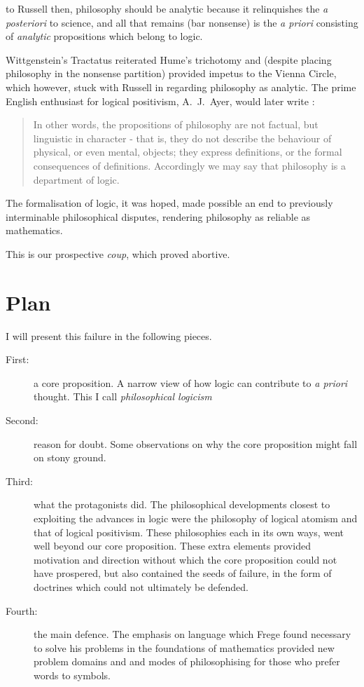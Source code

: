 to Russell then, philosophy should be analytic because it relinquishes the {\it a posteriori} to science, and all that remains (bar nonsense) is the {\it a priori} consisting of {\it analytic} propositions which belong to logic.

Wittgenstein's Tractatus \cite{wittgenstein1921} reiterated Hume's trichotomy and (despite placing philosophy in the nonsense partition) provided impetus to the Vienna Circle, which however, stuck with Russell in regarding philosophy as analytic.
The prime English enthusiast for logical positivism, A.~J.~Ayer, would later write \cite{ayer1936}:

\begin{quotation}
In other words, the propositions of philosophy are not factual, but
  linguistic in character - that is, they do not describe the behaviour of
  physical, or even mental, objects; they express definitions, or the formal
  consequences of definitions. Accordingly we may say that philosophy
  is a department of logic.
\end{quotation}

The formalisation of logic, it was hoped, made possible an end to previously interminable philosophical disputes, rendering philosophy as reliable as mathematics.

This is our prospective {\it coup}, which proved abortive.

\section{Plan}

I will present this failure in the following pieces.

\begin{description}
\item [First:] a core proposition.
A narrow view of how logic can contribute to {\it a priori} thought.
This I call {\it philosophical logicism}
\item [Second:] reason for doubt.
Some observations on why the core proposition might fall on stony ground.
\item [Third:] what the protagonists did.
The philosophical developments closest to exploiting the advances in logic were the philosophy of logical atomism and that of logical positivism.
These philosophies each in its own ways, went well beyond our core proposition.
These extra elements provided motivation and direction without which the core proposition could not have prospered, but also contained the seeds of failure, in the form of doctrines which could not ultimately be defended.
\item [Fourth:] the main defence.
The emphasis on language which Frege found necessary to solve his problems in the foundations of mathematics provided new problem domains and and modes of philosophising for those who prefer words to symbols.
\end{description}

